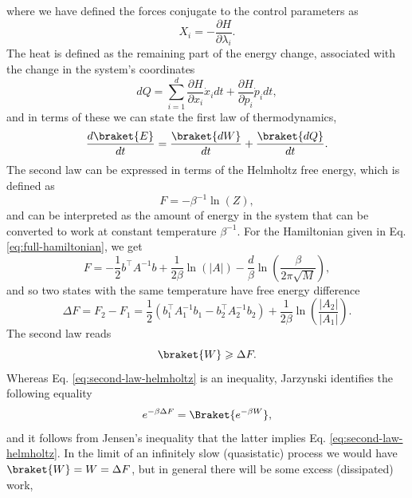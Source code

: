 \documentclass[prx,onecolumn,floatfix,longbibliography,notitlepage, nofootinbib,12pt]{revtex4-2}
\renewcommand{\geq}{\geqslant}
\begin{document}
\begin{appendix}
where we have defined the forces conjugate to the control parameters as 
\begin{equation}
    X_i = - \frac{\partial H}{\partial \lambda_i}.
\end{equation}
The heat is defined as the remaining part of the energy change, associated with the change in the system's coordinates
\begin{equation}
    dQ = \sum_{i=1}^d \frac{\partial H}{\partial x_i} \dot{x}_i dt + \frac{\partial H}{\partial p_i} \dot{p}_i dt ,
 \end{equation}
and in terms of these we can state the first law of thermodynamics,
\begin{equation}
    \frac{d \braket{E}}{dt} = \frac{\braket{dW}}{dt} + \frac{\braket{dQ}}{dt}.
\end{equation}
The second law can be expressed in terms of the Helmholtz free energy, which is defined as \cite{callen1998thermodynamics}
\begin{equation}
    F = -\beta^{-1} \ln(Z),
\end{equation}
and can be interpreted as the amount of energy in the system that can be converted to work at constant temperature $\beta^{-1}$. For the Hamiltonian given in Eq. \eqref{eq:full-hamiltonian}, we get
\begin{equation}
    F = -\frac{1}{2} b^\intercal A^{-1} b+ \frac{1}{2\beta} \ln \left(\left| A\right| \right) -\frac{d}{\beta} \ln\left(\frac{\beta}{2\pi \sqrt{M}}\right),
\end{equation}
and so two states with the same temperature have free energy difference
\begin{equation}
    \Delta F = F_2 - F_1 = \frac{1}{2}(b_1^\intercal A_1^{-1}b_1-b_2^\intercal A_2^{-1}b_2) + \frac{1}{2\beta} \ln \left( \frac{\left|A_2\right|}{\left|A_1\right|}\right).
\end{equation}
The second law reads
\begin{equation}
\label{eq:second-law-helmholtz}
    \braket{W} \geq \Delta F.
\end{equation}
Whereas Eq. \eqref{eq:second-law-helmholtz} is an inequality, Jarzynski identifies the following equality \cite{jarzynski1997nonequilibrium}
\begin{equation}
\label{eq:jarzynski-relation}
    e^{-\beta \Delta F} = \Braket{e^{-\beta W}},
\end{equation}
and it follows from Jensen's inequality \cite{jarzynski2011equalities} that the latter implies Eq. \eqref{eq:second-law-helmholtz}. In the limit of an infinitely slow (quasistatic) process we would have $\braket{W} = W =  \Delta F$, but in general there will be some excess (dissipated) work,

\end{appendix}
\end{document}
